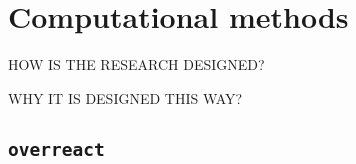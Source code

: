 \chapter{Computational methods}%
\label{ch:computational_methods}

HOW IS THE RESEARCH DESIGNED?

WHY IT IS DESIGNED THIS WAY?

\section{\texttt{overreact}}